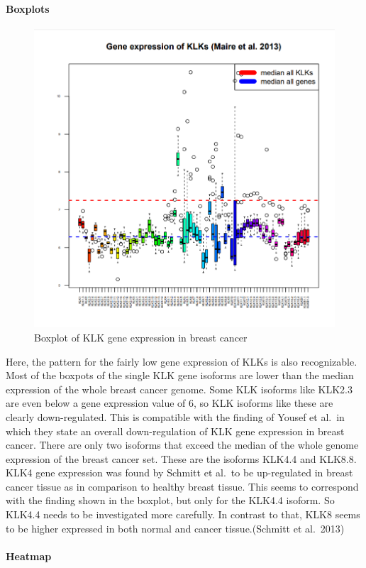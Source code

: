 \documentclass[
]{article}
\begin{document}
\hypertarget{boxplots}{%
\paragraph{Boxplots}\label{boxplots}}

\begin{figure}

{\centering \includegraphics[width=0.5\linewidth]{images/Boxplot_breast} 

}

\caption{Boxplot of KLK gene expression in breast cancer}\label{fig:Boxplot - breast }
\end{figure}

Here, the pattern for the fairly low gene expression of KLKs is also
recognizable. Most of the boxpots of the single KLK gene isoforms are
lower than the median expression of the whole breast cancer genome. Some
KLK isoforms like KLK2.3 are even below a gene expression value of 6, so
KLK isoforms like these are clearly down-regulated. This is compatible
with the finding of Yousef et al.~in which they state an overall
down-regulation of KLK gene expression in breast cancer. There are only
two isoforms that exceed the median of the whole genome expression of
the breast cancer set. These are the isoforms KLK4.4 and KLK8.8.\\
KLK4 gene expression was found by Schmitt et al.~to be up-regulated in
breast cancer tissue as in comparison to healthy breast tissue. This
seems to correspond with the finding shown in the boxplot, but only for
the KLK4.4 isoform. So KLK4.4 needs to be investigated more carefully.
In contrast to that, KLK8 seems to be higher expressed in both normal
and cancer tissue.(Schmitt et al.~2013)

\hypertarget{heatmap}{%
\paragraph{Heatmap}\label{heatmap}}
\end{document}
